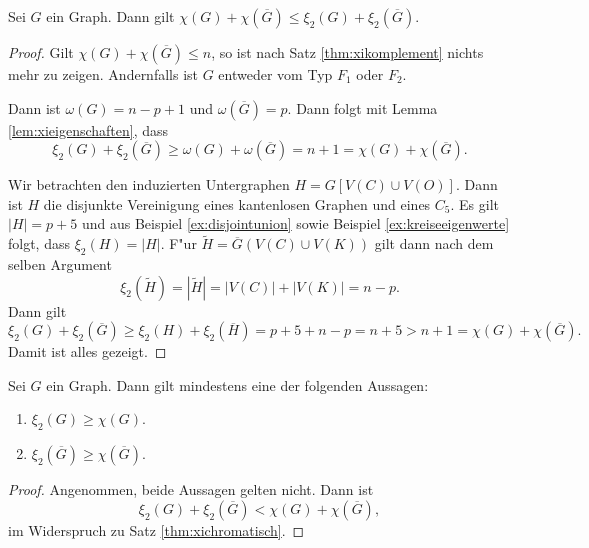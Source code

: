   \begin{theorem}
    Sei $G$ ein Graph. Dann gilt $\chi(G) + \chi(\overline{G}) \leq \xi_{2}(G) +  \xi_{2}(\overline{G})$.
    \label{thm:xichromatisch}
  \end{theorem}
  \begin{proof}
    Gilt $\chi(G) + \chi(\overline{G}) \leq n$, so ist nach Satz \ref{thm:xikomplement} nichts mehr zu zeigen. Andernfalls ist $G$ entweder vom Typ $F_1$ oder $F_2$. 

     Dann ist $\omega(G) = n-p+1$ und $\omega (\overline{G})=p$. Dann folgt mit Lemma \ref{lem:xieigenschaften}, dass 
    $$\xi_{2}(G) + \xi_{2}(\overline{G}) \geq \omega(G) + \omega(\overline{G}) = n+ 1 = \chi(G) + \chi(\overline{G}).$$

     Wir betrachten den induzierten Untergraphen $H=G[V(C) \cup V(O)]$. Dann ist $H$ die disjunkte Vereinigung eines kantenlosen Graphen und eines $C_5$. Es gilt $|H| = p+5$ und aus Beispiel \ref{ex:disjointunion} sowie Beispiel \ref{ex:kreiseeigenwerte} folgt, dass $\xi_{2}(H) = |H|$. 
    F"ur $\tilde{H} = \overline{G} (V(C) \cup V(K))$ gilt dann nach dem selben Argument $$\xi_{2}(\tilde{H}) = |\tilde{H}| = |V(C)| + |V(K)| = n-p .$$ Dann gilt 
    $$\xi_{2}(G) + \xi_{2}(\overline{G}) \geq \xi_{2}(H) + \xi_{2}(\overline{H}) = p+5 + n -p = n+ 5 > n+ 1 = \chi(G) + \chi(\overline{G}).$$
    Damit ist alles gezeigt.
  \end{proof}

  \begin{corollary}
    Sei $G$ ein Graph. Dann gilt mindestens eine der folgenden Aussagen:
    \begin{enumerate}[label=\rm{(\alph*)}]
      \item $\xi_2(G) \geq \chi(G)$.
      \item $\xi_{2}(\overline{G}) \geq \chi(\overline{G})$.
    \end{enumerate}
  \end{corollary}

  \begin{proof}
    Angenommen, beide Aussagen gelten nicht. Dann ist 
    $$\xi_2(G) + \xi_{2}(\overline{G}) < \chi(G) + \chi(\overline{G}), $$
    im Widerspruch zu Satz \ref{thm:xichromatisch}.
  \end{proof}

